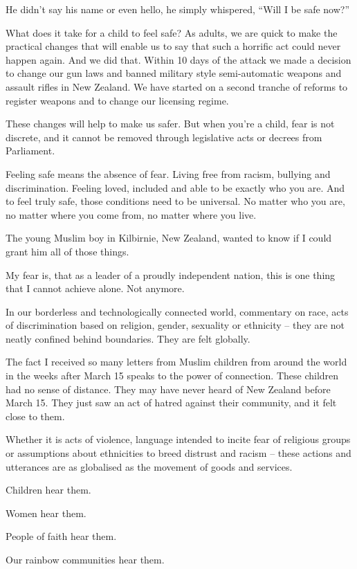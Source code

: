 \documentclass[10pt,a4paper]{article}
\begin{document}
He didn’t say his name or even hello, he simply whispered, “Will I be safe now?”

What does it take for a child to feel safe? As adults, we are quick to make the practical changes that will enable us to say that such a horrific act could never happen again. And we did that. Within 10 days of the attack we made a decision to change our gun laws and banned military style semi-automatic weapons and assault rifles in New Zealand. We have started on a second tranche of reforms to register weapons and to change our licensing regime.

These changes will help to make us safer. But when you’re a child, fear is not discrete, and it cannot be removed through legislative acts or decrees from Parliament.

Feeling safe means the absence of fear. Living free from racism, bullying and discrimination. Feeling loved, included and able to be exactly who you are. And to feel truly safe, those conditions need to be universal. No matter who you are, no matter where you come from, no matter where you live.

The young Muslim boy in Kilbirnie, New Zealand, wanted to know if I could grant him all of those things.

My fear is, that as a leader of a proudly independent nation, this is one thing that I cannot achieve alone. Not anymore.

In our borderless and technologically connected world, commentary on race, acts of discrimination based on religion, gender, sexuality or ethnicity – they are not neatly confined behind boundaries. They are felt globally.

The fact I received so many letters from Muslim children from around the world in the weeks after March 15 speaks to the power of connection. These children had no sense of distance. They may have never heard of New Zealand before March 15. They just saw an act of hatred against their community, and it felt close to them.

Whether it is acts of violence, language intended to incite fear of religious groups or assumptions about ethnicities to breed distrust and racism – these actions and utterances are as globalised as the movement of goods and services.

Children hear them.

Women hear them.

People of faith hear them.

Our rainbow communities hear them.
\end{document}
